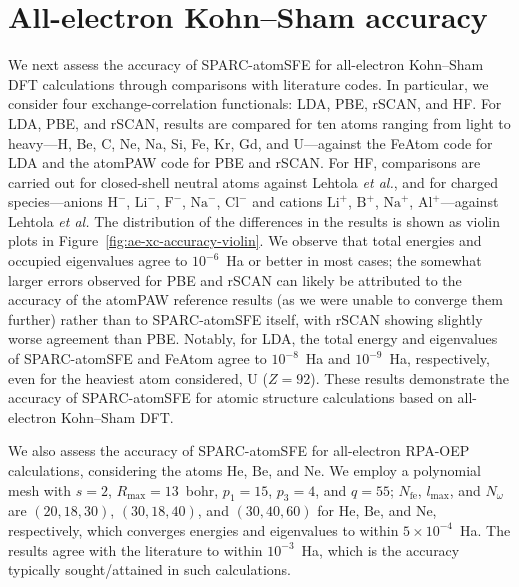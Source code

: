 \setlength{\belowcaptionskip}{6pt}
\section{All-electron Kohn--Sham accuracy}

We next assess the accuracy of SPARC-atomSFE for all-electron Kohn--Sham DFT calculations through comparisons with literature codes. In particular, we consider four exchange-correlation functionals: LDA, PBE, rSCAN, and HF. For LDA, PBE, and rSCAN, results are compared for ten atoms ranging from light to heavy---H, Be, C, Ne, Na, Si, Fe, Kr, Gd, and U---against the FeAtom code for LDA and the atomPAW code for PBE and rSCAN. For HF, comparisons are carried out for closed-shell neutral atoms against Lehtola \textit{et al.}, and for charged species---anions $\mathrm{H}^{-}$, $\mathrm{Li}^{-}$, $\mathrm{F}^{-}$, $\mathrm{Na}^{-}$, $\mathrm{Cl}^{-}$ and cations $\mathrm{Li}^{+}$, $\mathrm{B}^{+}$, $\mathrm{Na}^{+}$, $\mathrm{Al}^{+}$---against Lehtola \textit{et al.} The distribution of the differences in the results is shown as violin plots in Figure~\ref{fig:ae-xc-accuracy-violin}. We observe that total energies and occupied eigenvalues agree to $10^{-6}$~Ha or better in most cases; the somewhat larger errors observed for PBE and rSCAN can likely be attributed to the accuracy of the atomPAW reference results (as we were unable to converge them further) rather than to SPARC-atomSFE itself, with rSCAN showing slightly worse agreement than PBE. Notably, for LDA, the total energy and eigenvalues of SPARC-atomSFE and FeAtom agree to $10^{-8}$~Ha and $10^{-9}$~Ha, respectively, even for the heaviest atom considered, U ($Z=92$). These results demonstrate the accuracy of SPARC-atomSFE for atomic structure calculations based on all-electron Kohn--Sham DFT.


We also assess the accuracy of SPARC-atomSFE for all-electron RPA-OEP calculations, considering the atoms $\mathrm{He}$, $\mathrm{Be}$, and $\mathrm{Ne}$. We employ a polynomial mesh with $s=2$, $R_{\max}=13$~bohr, $p_1=15$, $p_3=4$, and $q=55$; $N_{\mathrm{fe}}$, $l_{\max}$, and $N_\omega$ are $(20,18,30)$, $(30,18,40)$, and $(30,40,60)$ for $\mathrm{He}$, $\mathrm{Be}$, and $\mathrm{Ne}$, respectively, which converges energies and eigenvalues to within $5\times10^{-4}$~Ha. The results agree with the literature to within $10^{-3}$~Ha, which is the accuracy typically sought/attained in such calculations.


